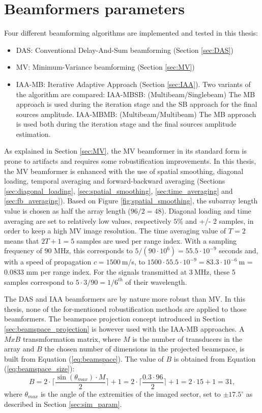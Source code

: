 \section{Beamformers parameters}
\label{sec:beamform_param}
Four different beamforming algorithms are implemented and tested in this thesis:
\begin{itemize}
    \item DAS: Conventional Delay-And-Sum beamforming (Section \ref{sec:DAS})
    \item MV: Minimum-Variance beamforming (Section \ref{sec:MV})
    \item IAA-MB: Iterative Adaptive Approach (Section \ref{sec:IAA}). Two variants of the algorithm are compared:
    \subitem IAA-MBSB: (Multibeam/Singlebeam) The MB approach is used during the iteration stage and the SB approach for the final sources amplitude.
    \subitem IAA-MBMB: (Multibeam/Multibeam) The MB approach is used both during the iteration stage and the final sources amplitude estimation.
\end{itemize}
\noindent
As explained in Section \ref{sec:MV}, the MV beamformer in its standard form is prone to artifacts and requires some robustification improvements. In this thesis, the MV beamformer is enhanced with the use of spatial smoothing, diagonal loading, temporal averaging and forward-backward averaging (Sections \ref{sec:diagonal_loading}, \ref{sec:spatial_smoothing}, \ref{sec:time_averaging} and \ref{sec:fb_averaging}).
Based on Figure \ref{fig:spatial_smoothing}, the subarray length value is chosen as half the array length ($96/2 = 48$). Diagonal loading and time averaging are set to relatively low values, respectively $5\%$ and +/- 2 samples, in order to keep a high MV image resolution. The time averaging value of $T=2$ means that $2T+1=5$ samples are used per range index. With a sampling frequency of 90 MHz, this corresponds to $5 / (90 \cdot 10^6) = 55.5 \cdot 10^{-9}$ seconds and, with a speed of propagation $c = 1500~$m/s, to $1500 \cdot 55.5 \cdot 10^{-9} = 83.3 \cdot 10^{-6}~$m = 0.0833 mm per range index.
For the signals transmitted at $3~$MHz, these 5 samples correspond to $5 \cdot 3 / 90 = 1/6^{th}$ of their wavelength.

The DAS and IAA beamformers are by nature more robust than MV. In this thesis, none of the for-mentioned robustification methods are applied to those beamformers. The beamspace projection concept introduced in Section \ref{sec:beamspace_projection} is however used with the IAA-MB approaches. A $M x B$ transmformation matrix, where $M$ is the number of transducers in the array and $B$ the chosen number of dimensions in the projected beamspace, is built from Equation (\ref{eq:beamspace}). The value of $B$ is obtained from Equation (\ref{eq:beamspace_size}):
\begin{equation}
    B = 2 \cdot \lceil \frac{\sin(\theta_{max}) \cdot M}{2} \rceil + 1 = 2 \cdot \lceil \frac{0.3 \cdot 96}{2} \rceil + 1 = 2 \cdot 15 + 1 = 31,
\end{equation}
\noindent
where $\theta_{max}$ is the angle of the extremities of the imaged sector, set to $\pm 17.5^\circ$ as described in Section \ref{sec:sim_param}.

